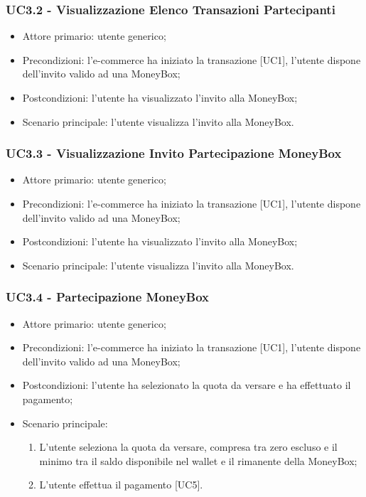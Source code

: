 \subsubsection{UC3.2 - Visualizzazione Elenco Transazioni Partecipanti}

\begin{itemize}
    \item Attore primario: utente generico;
    \item Precondizioni: l'e-commerce\glo{} ha iniziato la transazione [UC1], l'utente dispone dell'invito valido ad una MoneyBox\glo{};
    \item Postcondizioni: l'utente ha visualizzato l'invito alla MoneyBox\glo{};
    \item Scenario principale: l'utente visualizza l'invito alla MoneyBox\glo{}.
\end{itemize}

\subsubsection{UC3.3 - Visualizzazione Invito Partecipazione MoneyBox}

\begin{itemize}
    \item Attore primario: utente generico;
    \item Precondizioni: l'e-commerce\glo{} ha iniziato la transazione [UC1], l'utente dispone dell'invito valido ad una MoneyBox\glo{};
    \item Postcondizioni: l'utente ha visualizzato l'invito alla MoneyBox\glo{};
    \item Scenario principale: l'utente visualizza l'invito alla MoneyBox\glo{}.
\end{itemize}

\subsubsection{UC3.4 - Partecipazione MoneyBox}

\begin{itemize}
    \item Attore primario: utente generico;
    \item Precondizioni: l'e-commerce\glo{} ha iniziato la transazione [UC1], l'utente dispone dell'invito valido ad una MoneyBox\glo{};
    \item Postcondizioni: l'utente ha selezionato la quota da versare e ha effettuato il pagamento;
    \item Scenario principale:
          \begin{enumerate}
              \item L'utente seleziona la quota da versare, compresa tra zero escluso e il minimo tra il saldo disponibile nel wallet e il rimanente della MoneyBox\glo{};
              \item L'utente effettua il pagamento [UC5].
          \end{enumerate}
\end{itemize}

